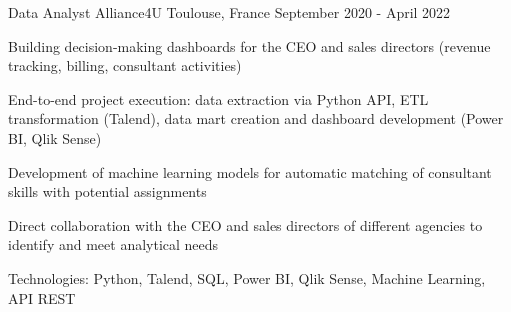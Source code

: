 \begin{cventries}

\cventry
{Data Analyst} %
{Alliance4U} %
{Toulouse, France} %
{September 2020 - April 2022} %
{ %
\begin{cvitems}
\item {Building decision-making dashboards for the CEO and sales directors (revenue tracking, billing, consultant activities)}
\item {End-to-end project execution: data extraction via Python API, ETL transformation (Talend), data mart creation and dashboard development (Power BI, Qlik Sense)}
\item {Development of machine learning models for automatic matching of consultant skills with potential assignments}
\item {Direct collaboration with the CEO and sales directors of different agencies to identify and meet analytical needs}
\item {Technologies: Python, Talend, SQL, Power BI, Qlik Sense, Machine Learning, API REST}
\end{cvitems}
}
\vspace{1.5em}


\end{cventries}
